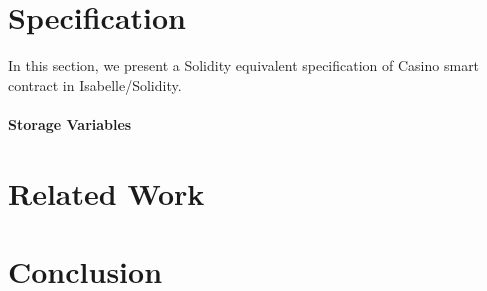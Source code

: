 \documentclass[a4paper,UKenglish,cleveref, autoref, thm-restate]{oasics-v2021}
\begin{document}
\section{Specification}
In this section, we present a Solidity equivalent specification of Casino smart contract in Isabelle/Solidity. 
%
\paragraph*{Storage Variables}
%


\section{Related Work}
\section{Conclusion}



\end{document}
